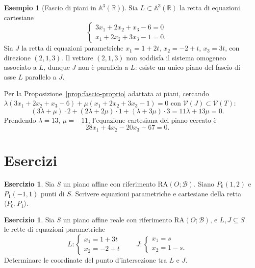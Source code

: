 \documentclass[11pt, a4paper]{book}
\theoremstyle{definition}
\newtheorem{esempio}[definizione]{Esempio}
\newtheorem{esercizio}[definizione]{Esercizio}
\theoremstyle{plain}
\theoremstyle{remark}
\newcommand{\R}{\mathbb{R}}
\newcommand{\VV}{\mathcal{V}}   %
\newcommand{\RA}{\mathrm{RA}}   %
\begin{document}
\begin{exbox}
\begin{esempio}[Fascio di piani in $\mathbb{A}^3(\R)$]
Sia $L \subset \mathbb{A}^3(\R)$ la retta di equazioni cartesiane
\[
  \begin{cases} 3x_1 + 2x_2 + x_3 - 6 = 0 \\ x_1 + 2x_2 + 3x_3 - 1 = 0. \end{cases}
\]
Sia $J$ la retta di equazioni parametriche $x_1 = 1+2t$, $x_2 = -2+t$, $x_3 = 3t$, con direzione $(2,1,3)$. Il vettore $(2,1,3)$ non soddisfa il sistema omogeneo associato a $L$, dunque $J$ non è parallela a $L$: esiste un unico piano del fascio di asse $L$ parallelo a $J$.

Per la Proposizione~\ref{prop:fascio-proprio} adattata ai piani, cercando $\lambda(3x_1 + 2x_2 + x_3 - 6) + \mu(x_1 + 2x_2 + 3x_3 - 1) = 0$ con $\VV(J) \subset \VV(T)$:
\[
  (3\lambda + \mu) \cdot 2 + (2\lambda + 2\mu) \cdot 1 + (\lambda + 3\mu) \cdot 3 = 11\lambda + 13\mu = 0.
\]
Prendendo $\lambda = 13$, $\mu = -11$, l'equazione cartesiana del piano cercato è
\[
  28x_1 + 4x_2 - 20x_3 - 67 = 0.
\]
\end{esempio}
\end{exbox}

\section*{Esercizi}
\label{sec:es-cap4}

\begin{esercizio}
Sia $S$ un piano affine con riferimento $\RA(O;\mathcal{B})$. Siano $P_0(1,2)$ e $P_1(-1,1)$ punti di $S$. Scrivere equazioni parametriche e cartesiane della retta $\langle P_0, P_1 \rangle$.
\end{esercizio}

\begin{esercizio}
Sia $S$ un piano affine reale con riferimento $\RA(O;\mathcal{B})$, e $L, J \subseteq S$ le rette di equazioni parametriche
\[
  L\colon \begin{cases} x_1 = 1 + 3t \\ x_2 = -2 + t \end{cases} \qquad J\colon \begin{cases} x_1 = s \\ x_2 = 1 - s. \end{cases}
\]
Determinare le coordinate del punto d'intersezione tra $L$ e $J$.
\end{esercizio}
\end{document}
